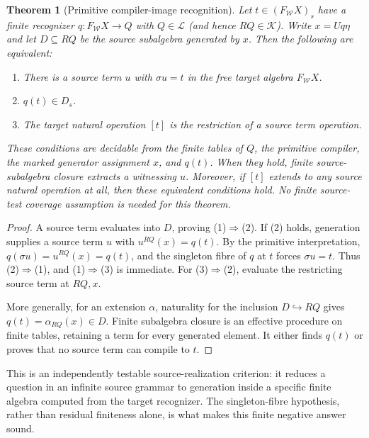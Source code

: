 \documentclass[11pt]{article}
\newtheorem{theorem}{Theorem}[section]
\theoremstyle{definition}
\theoremstyle{remark}
\begin{document}
\begin{theorem}[Primitive compiler-image recognition]\label{alg-thm:compilerimage}
Let $t\in(F_{\mathcal W}X)_s$ have a finite recognizer
$q:F_{\mathcal W}X\to Q$ with $Q\in\mathcal L$ (and hence $RQ\in\mathcal K$). Write
$x=Uq\eta$ and let $D\subseteq RQ$ be the source subalgebra generated by
$x$. Then the following are equivalent:
\begin{enumerate}
\item There is a source term $u$ with $\sigma u=t$ in the free target
      algebra $F_{\mathcal W}X$.
\item $q(t)\in D_s$.
\item The target natural operation $[t]$ is the restriction of a source
      term operation.
\end{enumerate}
These conditions are decidable from the finite tables of $Q$, the
primitive compiler, the marked generator assignment $x$, and $q(t)$. When they hold, finite source-subalgebra
closure extracts a witnessing $u$. Moreover, if $[t]$ extends to any
source natural operation at all, then these equivalent conditions hold.
No finite source-test coverage assumption is needed for this theorem.
\end{theorem}
\begin{proof}
A source term evaluates into $D$, proving (1)$\Rightarrow$(2).
If (2) holds, generation supplies a source term $u$ with
$u^{RQ}(x)=q(t)$. By the primitive interpretation,
$q(\sigma u)=u^{RQ}(x)=q(t)$, and the singleton fibre of $q$ at $t$
forces $\sigma u=t$. Thus (2)$\Rightarrow$(1), and (1)$\Rightarrow$(3)
is immediate. For (3)$\Rightarrow$(2), evaluate the restricting source
term at $RQ,x$.

More generally, for an extension $\alpha$, naturality for the inclusion
$D\hookrightarrow RQ$ gives
$q(t)=\alpha_{RQ}(x)\in D$. Finite subalgebra closure is an effective
procedure on finite tables, retaining a term for every generated element.
It either finds $q(t)$ or proves that no source term can compile to $t$.
\end{proof}

This is an independently testable source-realization criterion: it
reduces a question in an infinite source grammar to generation inside a
specific finite algebra computed from the target recognizer. The
singleton-fibre hypothesis, rather than residual finiteness alone, is
what makes this finite negative answer sound.
\end{document}
